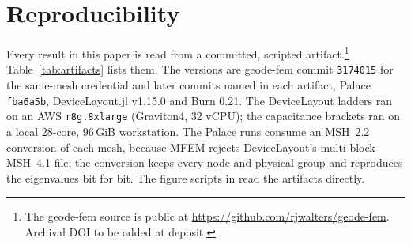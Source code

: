 \documentclass{anvil-paper}
\begin{document}
\section{Reproducibility}
\label{sec:repro}

Every result in this paper is read from a committed, scripted
artifact.\footnote{The geode-fem source is public at
\url{https://github.com/rjwalters/geode-fem}. Archival DOI to be added at
deposit.}
Table~\ref{tab:artifacts} lists them. The versions are geode-fem commit
\texttt{3174015} for the same-mesh credential and later commits named in
each artifact, Palace \texttt{fba6a5b}, DeviceLayout.jl v1.15.0 and
Burn 0.21. The DeviceLayout ladders ran on an AWS \texttt{r8g.8xlarge}
(Graviton4, 32 vCPU); the capacitance brackets ran on a local 28-core,
96\,GiB workstation. The Palace runs consume an MSH~2.2 conversion of each mesh,
because MFEM rejects DeviceLayout's multi-block MSH~4.1 file; the
conversion keeps every node and physical group and reproduces the
eigenvalues bit for bit. The figure scripts in  read
the artifacts directly.
\end{document}
